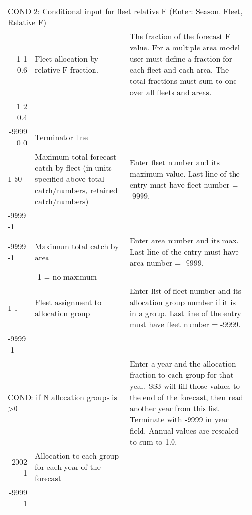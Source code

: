 \begin{landscape}
{\begin{longtable}{p{3.2cm} p{7cm} p{10.8cm}}
 \hline 
 \multicolumn{3}{l}{COND 2: Conditional input for fleet relative F (Enter: Season, Fleet, Relative F)} \Tstrut\\
 \multicolumn{1}{r}{1 1 0.6}  & Fleet allocation by relative F fraction. & \multirow{1}{1cm}[-0.25cm]{\parbox{11cm}{The fraction of the forecast F value.  For a multiple area model user must define a fraction for each fleet and each area.  The total fractions must sum to one over all fleets and areas.}}\\
 \multicolumn{1}{r}{1 2 0.4}  &  & \\
 \multicolumn{1}{r}{-9999 0 0}  & Terminator line &   \Bstrut\\ 

  \hline
  1 50 & Maximum total forecast catch by fleet (in units specified above total catch/numbers, retained catch/numbers) & \multirow{1}{1cm}[-0.25cm]{\parbox{11cm}{Enter fleet number and its maximum value. Last line of the entry must have fleet number = -9999.}} \Tstrut\\
  -9999 -1 & & \Bstrut\\
  \hline
  
  -9999 -1 & Maximum total catch by area & \multirow{1}{1cm}[-0.25cm]{\parbox{11cm}{Enter area number and its max. Last line of the entry must have area number = -9999.}} \Tstrut\\
     & -1 = no maximum & \Bstrut\\
     
  \hline
  1 1  & Fleet assignment to allocation group & \multirow{1}{1cm}[-0.25cm]{\parbox{11cm}{Enter list of fleet number and its allocation group number if it is in a group. Last line of the entry must have fleet number = -9999.}} \Tstrut\\
  -9999 -1  & &  \Bstrut\\ 
    
  \multicolumn{2}{l}{COND: if N allocation groups is >0 } & \multirow{1}{1cm}[-0.25cm]{\parbox{11cm}{ Enter a year and the allocation fraction to each group for that year.  SS3 will fill those values to the end of the forecast, then read another year from this list.  Terminate with -9999 in year field. Annual values are rescaled to sum to 1.0.}} \Tstrut \\
  \multicolumn{1}{r}{2002 1}  & Allocation to each group for each year of the forecast & \\
  \multicolumn{1}{r}{-9999 1} & & \Bstrut\\
  

\end{longtable}}
\end{landscape}
